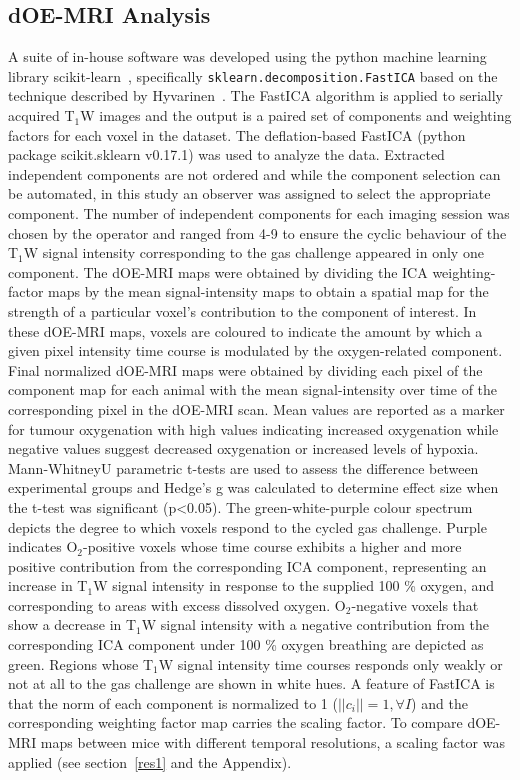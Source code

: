 \documentclass[num-refs]{wiley-article}
\begin{document}
\subsection{dOE-MRI Analysis}
A suite of in-house software was developed using the python machine learning library scikit-learn~\cite{Pedregosa:2011tv}, specifically \texttt{sklearn.decomposition.FastICA} based on the technique described by Hyvarinen~\cite{Hyvarinen:2000vk}.
The FastICA algorithm is applied to serially acquired T$_1$W images and the output is a paired set of components and weighting factors for each voxel in the dataset.
The deflation-based FastICA (python package scikit.sklearn v0.17.1) was used to analyze the data. 
Extracted independent components are not ordered and while the component selection can be automated, in this study an observer was assigned to select the appropriate component.
The number of independent components for each imaging session was chosen by the operator and ranged from 4-9 to ensure the cyclic behaviour of the T$_1$W signal intensity corresponding to the gas challenge appeared in only one component. 
The dOE-MRI maps were obtained by dividing the ICA weighting-factor maps by the mean signal-intensity maps to obtain a spatial map for the strength of a particular voxel's contribution to the component of interest.
In these dOE-MRI maps, voxels are coloured to indicate the amount by which a given pixel intensity time course is modulated by the oxygen-related component. 
Final normalized dOE-MRI maps were obtained by dividing each pixel of the component map for each animal with the mean signal-intensity over time of the corresponding pixel in the dOE-MRI scan. 
Mean values are reported as a marker for tumour oxygenation with high values indicating increased oxygenation while negative values suggest decreased oxygenation or increased levels of hypoxia. 
Mann-WhitneyU parametric t-tests are used to assess the difference between experimental groups and Hedge's g was calculated to determine effect size when the t-test was significant (p<0.05).
The green-white-purple colour spectrum depicts the degree to which voxels respond to the cycled gas challenge.
Purple indicates O$_2$-positive voxels whose time course exhibits a higher and more positive contribution from the corresponding ICA component, representing an increase in T$_1$W signal intensity in response to the supplied 100 \% oxygen, and corresponding to areas with excess dissolved oxygen. 
O$_2$-negative voxels that show a decrease in T$_1$W signal intensity with a negative contribution from the corresponding ICA component under 100 \% oxygen breathing are depicted as green. 
Regions whose T$_1$W signal intensity time courses responds only weakly or not at all to the gas challenge are shown in white hues.
A feature of FastICA is that the norm of each component is normalized to 1 ($||c_i||=1, \forall I$) and the corresponding weighting factor map carries the scaling factor.
To compare dOE-MRI maps between mice with different temporal resolutions, a scaling factor was applied (see section~\ref{res1} and the Appendix).
\end{document}
